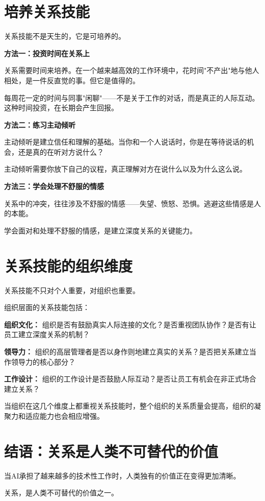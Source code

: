 \section{培养关系技能}


关系技能不是天生的，它是可培养的。

\textbf{方法一：投资时间在关系上}

关系需要时间来培养。在一个越来越高效的工作环境中，花时间"不产出"地与他人相处，是一件反直觉的事。但它是值得的。

每周花一定的时间与同事"闲聊"——不是关于工作的对话，而是真正的人际互动。这种时间投资，在长期会产生回报。

\textbf{方法二：练习主动倾听}

主动倾听是建立信任和理解的基础。当你和一个人说话时，你是在等待说话的机会，还是真的在听对方说什么？

主动倾听需要你放下自己的议程，真正理解对方在说什么以及为什么这么说。

\textbf{方法三：学会处理不舒服的情感}

关系中的冲突，往往涉及不舒服的情感——失望、愤怒、恐惧。逃避这些情感是人的本能。

学会面对和处理不舒服的情感，是建立深度关系的关键能力。

\section{关系技能的组织维度}


关系技能不只对个人重要，对组织也重要。

组织层面的关系技能包括：

\textbf{组织文化：} 组织是否有鼓励真实人际连接的文化？是否重视团队协作？是否有让员工建立深度关系的机制？

\textbf{领导力：} 组织的高层管理者是否以身作则地建立真实的关系？是否把关系建立当作领导力的核心部分？

\textbf{工作设计：} 组织的工作设计是否鼓励人际互动？是否让员工有机会在非正式场合建立关系？

当组织在这几个维度上都重视关系技能时，整个组织的关系质量会提高，组织的凝聚力和适应能力也会相应增强。

\section{结语：关系是人类不可替代的价值}


当AI承担了越来越多的技术性工作时，人类独有的价值正在变得更加清晰。

关系，是人类不可替代的价值之一。

